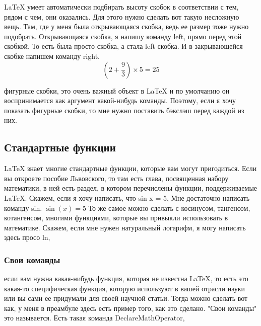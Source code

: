 \documentclass[a4paper,12pt]{article} %
\begin{document}
LaTeX умеет автоматически подбирать высоту
скобок в соответствии с тем, рядом с чем, они
оказались. Для этого нужно сделать вот такую
несложную вещь. Там, где у меня была открывающаяся скобка,
ведь ее размер тоже нужно подобрать. Открывающаяся скобка, я напишу команду
left, прямо перед этой скобкой. То есть была просто скобка, а стала left
скобка. И в закрывающейся скобке напишем команду
right.
\[\left(2+\frac{9}{3}\right)\times5=25\]

фигурные скобки, это очень
важный объект в LaTeX и по умолчанию он воспринимается как
аргумент какой-нибудь команды.  Поэтому, если я хочу показать фигурные
скобки, то мне нужно поставить бэкслэш перед каждой
из них.

\subsection{Стандартные функции}
 LaTeX знает многие стандартные функции,
 которые вам могут пригодиться. Если вы откроете пособие Львовского, то
 там есть глава, посвященная набору математики, в ней есть раздел, в котором
 перечислены функции, поддерживаемые LaTeX. Скажем, если я хочу написать,
 что sin x = 5, Мне достаточно написать команду sin. $\sin(x)=5$
 То же самое можно сделать с косинусом,
 тангенсом, котангенсом, многими функциями, которые
 вы привыкли использовать в математике. Скажем, если мне нужен натуральный
 логарифм, я могу написать здесь просо ln,
\subsubsection{Свои команды}
 если вам нужна какая-нибудь функция,
 которая не известна LaTeX, то есть это какая-то специфическая
 функция, которую используют в вашей отрасли науки или вы сами ее
 придумали для своей научной статьи. Тогда можно сделать вот как, у меня в преамбуле здесь есть пример того, как это
 сделано. "Свои команды" это называется. Есть такая команда DeclareMathOperator,
 
\end{document}
